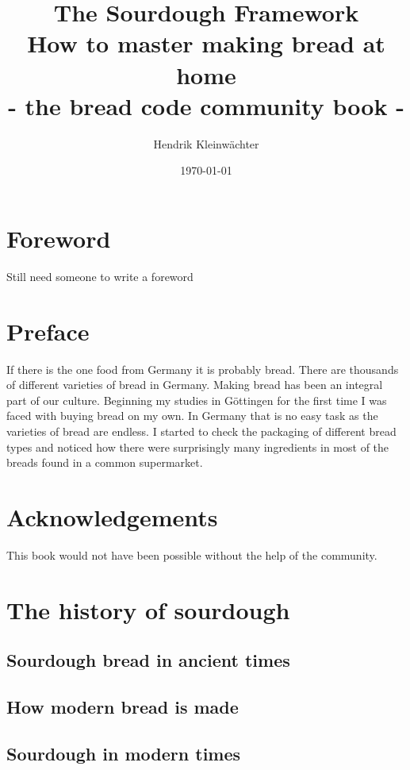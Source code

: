 \documentclass[a4paper, 12pt]{book}
\title{%
  The Sourdough Framework\\
  \large How to master making bread at home\\
  \small - the bread code community book -}
\author{Hendrik Kleinwächter}
\date{\today}
\begin{document}
\begin{titlepage}
\maketitle
\end{titlepage}


\frontmatter

\tableofcontents

\chapter{Foreword}

Still need someone to write a foreword

\chapter{Preface}

If there is the one food from Germany it is probably bread. There are thousands
of different varieties of bread in Germany. Making bread has been an integral part
of our culture. Beginning my studies in Göttingen for the first time I was faced
with buying bread on my own. In Germany that is no easy task
as the varieties of bread are endless. I started to check the packaging
of different bread types and noticed how there were surprisingly
many ingredients in most of the breads found in a common supermarket.


\chapter{Acknowledgements}

This book would not have been possible without the help of the community.


\mainmatter

\chapter{The history of sourdough}
\section{Sourdough bread in ancient times}
\section{How modern bread is made}
\section{Sourdough in modern times}
\end{document}
